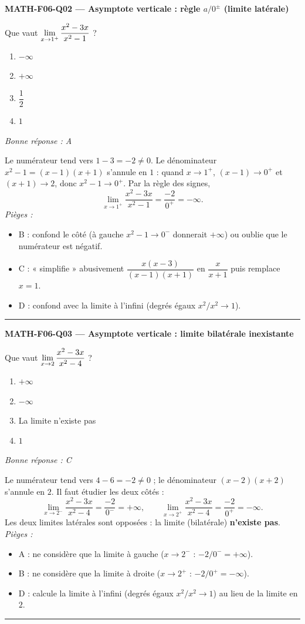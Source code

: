 \documentclass[11pt,a4paper]{article}
\begin{document}
\noindent\textbf{MATH-F06-Q02 --- Asymptote verticale : règle $a/0^{\pm}$ (limite latérale)}\par
Que vaut $\displaystyle\lim_{x\to 1^{+}}\frac{x^{2}-3x}{x^{2}-1}$ ?
\begin{enumerate}[label=\Alph*)]
\item $-\infty$
\item $+\infty$
\item $\dfrac{1}{2}$
\item $1$
\end{enumerate}
\textit{Bonne réponse : A}\par
Le numérateur tend vers $1-3=-2\neq 0$. Le dénominateur $x^{2}-1=(x-1)(x+1)$ s'annule en $1$ :
quand $x\to 1^{+}$, $(x-1)\to 0^{+}$ et $(x+1)\to 2$, donc $x^{2}-1\to 0^{+}$. Par la règle des signes,
\[ \lim_{x\to 1^{+}}\frac{x^{2}-3x}{x^{2}-1}=\frac{-2}{0^{+}}=-\infty. \]
\textit{Pièges :}
\begin{itemize}
\item B : confond le côté (à gauche $x^{2}-1\to 0^{-}$ donnerait $+\infty$) ou oublie que le numérateur est négatif.
\item C : « simplifie » abusivement $\dfrac{x(x-3)}{(x-1)(x+1)}$ en $\dfrac{x}{x+1}$ puis remplace $x=1$.
\item D : confond avec la limite à l'infini (degrés égaux $x^{2}/x^{2}\to 1$).
\end{itemize}
\vspace{8pt}\hrule\vspace{8pt}

\noindent\textbf{MATH-F06-Q03 --- Asymptote verticale : limite bilatérale inexistante}\par
Que vaut $\displaystyle\lim_{x\to 2}\frac{x^{2}-3x}{x^{2}-4}$ ?
\begin{enumerate}[label=\Alph*)]
\item $+\infty$
\item $-\infty$
\item La limite n'existe pas
\item $1$
\end{enumerate}
\textit{Bonne réponse : C}\par
Le numérateur tend vers $4-6=-2\neq 0$ ; le dénominateur $(x-2)(x+2)$ s'annule en $2$. Il faut étudier
les deux côtés :
\[ \lim_{x\to 2^{-}}\frac{x^{2}-3x}{x^{2}-4}=\frac{-2}{0^{-}}=+\infty,\qquad
   \lim_{x\to 2^{+}}\frac{x^{2}-3x}{x^{2}-4}=\frac{-2}{0^{+}}=-\infty. \]
Les deux limites latérales sont opposées : la limite (bilatérale) \textbf{n'existe pas}.
\textit{Pièges :}
\begin{itemize}
\item A : ne considère que la limite à gauche ($x\to 2^{-}$ : $-2/0^{-}=+\infty$).
\item B : ne considère que la limite à droite ($x\to 2^{+}$ : $-2/0^{+}=-\infty$).
\item D : calcule la limite à l'infini (degrés égaux $x^{2}/x^{2}\to 1$) au lieu de la limite en $2$.
\end{itemize}
\vspace{8pt}\hrule\vspace{8pt}
\end{document}
